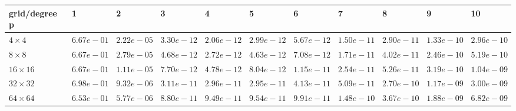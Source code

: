 \begin{tabular}{lllllllllll}
\hline
 grid/degree p   & 1          & 2          & 3          & 4          & 5          & 6          & 7          & 8          & 9          & 10         \\
\hline
 $4 \times 4$    & $6.67e-01$ & $2.22e-05$ & $3.30e-12$ & $2.06e-12$ & $2.99e-12$ & $5.67e-12$ & $1.50e-11$ & $2.90e-11$ & $1.33e-10$ & $2.96e-10$ \\
 $8 \times 8$    & $6.67e-01$ & $2.79e-05$ & $4.68e-12$ & $2.72e-12$ & $4.63e-12$ & $7.08e-12$ & $1.71e-11$ & $4.02e-11$ & $2.46e-10$ & $5.19e-10$ \\
 $16 \times 16$  & $6.67e-01$ & $1.11e-05$ & $7.70e-12$ & $4.78e-12$ & $8.04e-12$ & $1.15e-11$ & $2.54e-11$ & $5.26e-11$ & $3.19e-10$ & $1.04e-09$ \\
 $32 \times 32$  & $6.98e-01$ & $9.32e-06$ & $3.11e-11$ & $2.96e-11$ & $2.95e-11$ & $4.13e-11$ & $5.09e-11$ & $2.70e-10$ & $1.17e-09$ & $3.00e-09$ \\
 $64 \times 64$  & $6.53e-01$ & $5.77e-06$ & $8.80e-11$ & $9.49e-11$ & $9.54e-11$ & $9.91e-11$ & $1.48e-10$ & $3.67e-10$ & $1.88e-09$ & $6.82e-09$ \\
\hline
\end{tabular}